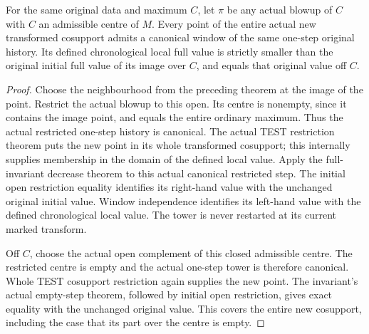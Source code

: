 \begin{theorem}
\label{hir:sharp-actual-first-step-chronological-local-drop}
\leanok
For the same original data and maximum $C$, let $\pi$ be any actual blowup
of $C$ with $C$ an admissible centre of $M$. Every point of the entire
actual new transformed cosupport admits a canonical window of the same
one-step original history. Its defined chronological local full value
is strictly smaller than the original initial full value of its image
over $C$, and equals that original value off $C$.
\end{theorem}
\begin{proof}
Choose the neighbourhood from the preceding theorem at the image of the
point. Restrict the actual blowup to this open. Its centre is nonempty,
since it contains the image point, and equals the entire ordinary maximum.
Thus the actual restricted one-step history is canonical. The actual
TEST restriction theorem puts the new point in its whole transformed
cosupport; this internally supplies membership in the domain of the
defined local value. Apply the full-invariant decrease theorem to this
actual canonical restricted step. The initial open restriction equality
identifies its right-hand value with the unchanged original initial
value. Window independence identifies its left-hand value with the
defined chronological local value. The tower is never restarted at its
current marked transform.

Off $C$, choose the actual open complement of this closed admissible
centre. The restricted centre is empty and the actual one-step tower is
therefore canonical. Whole TEST cosupport restriction again supplies
the new point. The invariant's actual empty-step theorem, followed by
initial open restriction, gives exact equality with the unchanged original
value. This covers the entire new cosupport, including the case that its
part over the centre is empty.
\end{proof}

